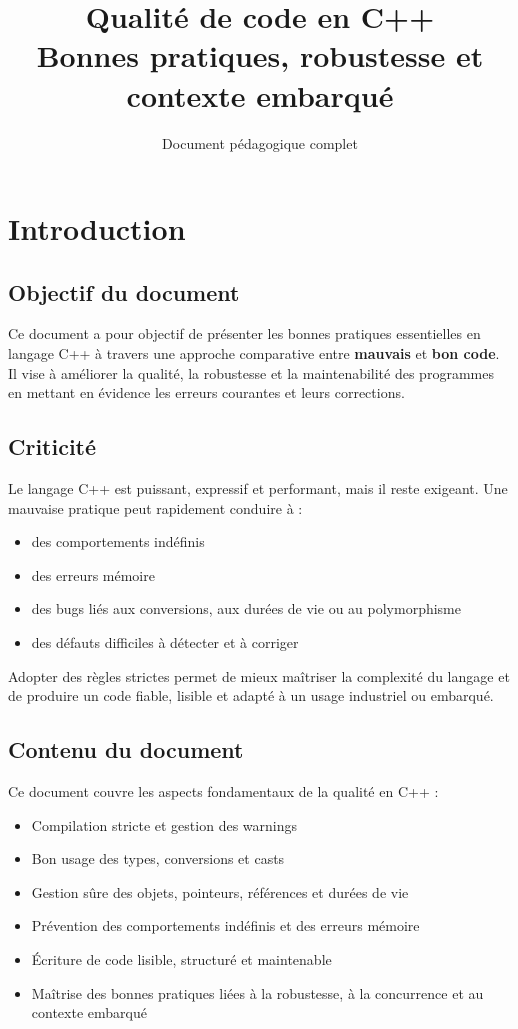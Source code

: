 \documentclass[a4paper,11pt]{report}
\title{\textbf{Qualité de code en C++}\\
Bonnes pratiques, robustesse et contexte embarqué}
\author{Document pédagogique complet}
\begin{document}
\maketitle
\tableofcontents
\newpage

\chapter{Introduction}

\section{Objectif du document}

Ce document a pour objectif de présenter les bonnes pratiques essentielles en langage C++ à travers une approche comparative entre \textbf{mauvais} et \textbf{bon code}. Il vise à améliorer la qualité, la robustesse et la maintenabilité des programmes en mettant en évidence les erreurs courantes et leurs corrections.

\section{Criticité}

Le langage C++ est puissant, expressif et performant, mais il reste exigeant.
Une mauvaise pratique peut rapidement conduire à :
\begin{itemize}
  \item des comportements indéfinis
  \item des erreurs mémoire
  \item des bugs liés aux conversions, aux durées de vie ou au polymorphisme
  \item des défauts difficiles à détecter et à corriger
\end{itemize}

Adopter des règles strictes permet de mieux maîtriser la complexité du langage et de produire un code fiable, lisible et adapté à un usage industriel ou embarqué.

\section{Contenu du document}

Ce document couvre les aspects fondamentaux de la qualité en C++ :
\begin{itemize}
  \item Compilation stricte et gestion des warnings
  \item Bon usage des types, conversions et casts
  \item Gestion sûre des objets, pointeurs, références et durées de vie
  \item Prévention des comportements indéfinis et des erreurs mémoire
  \item Écriture de code lisible, structuré et maintenable
  \item Maîtrise des bonnes pratiques liées à la robustesse, à la concurrence et au contexte embarqué
\end{itemize}
\end{document}
